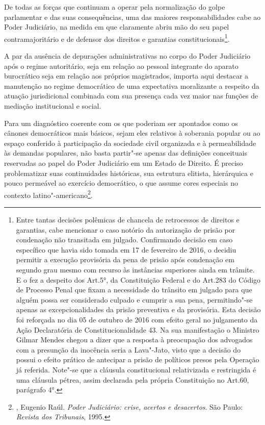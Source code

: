 De todas as forças que continuam a operar pela normalização do golpe
parlamentar e das suas consequências, uma das maiores responsabilidades
cabe ao Poder Judiciário, na medida em que claramente abriu mão do seu
papel contramajoritário e de defensor dos direitos e garantias
constitucionais\footnote{Entre tantas decisões polêmicas de chancela de
  retrocessos de direitos e garantias, cabe mencionar o caso notório da
  autorização de prisão por condenação não transitada em julgado.
  Confirmando decisão em caso específico que havia sido tomada em 17 de
  fevereiro de 2016, o  decidiu permitir a execução provisória da
  pena de prisão após condenação em segundo grau mesmo com recurso às
  instâncias superiores ainda em trâmite. E o fez a despeito dos Art.5°,
   da Constituição Federal e do Art.283 do Código de Processo Penal
  que fixam a necessidade do trânsito em julgado para que alguém possa
  ser considerado culpado e cumprir a sua pena, permitindo"-se apenas as
  excepcionalidades da prisão preventiva e da provisória. Esta decisão
  foi reforçada no dia 05 de outubro de 2016 com efeito geral no
  julgamento da Ação Declaratória de Constitucionalidade 43. Na sua
  manifestação o Ministro Gilmar Mendes chegou a dizer que a resposta à
  preocupação dos advogados com a presunção da inocência seria a
  Lava"-Jato, visto que a decisão do  possui o efeito prático de
  antecipar a prisão de políticos presos pela Operação já referida.
  Note"-se que a cláusula constitucional relativizada e restringida é uma
  cláusula pétrea, assim declarada pela própria Constituição no Art.60,
  parágrafo 4°.}.

A par da ausência de depurações administrativas no corpo do Poder
Judiciário após o regime autoritário, seja em relação ao pessoal
integrante do aparato burocrático seja em relação aos próprios
magistrados, importa aqui destacar a manutenção no regime democrático de
uma expectativa moralizante a respeito da atuação jurisdicional
combinada com sua presença cada vez maior nas funções de mediação
institucional e social.

Para um diagnóstico coerente com os que poderiam ser apontados como os
cânones democráticos mais básicos, sejam eles relativos à soberania
popular ou ao espaço conferido à participação da sociedade civil
organizada e à permeabilidade às demandas populares, não basta partir"-se
apenas das definições conceituais reservadas ao papel do Poder
Judiciário em um Estado de Direito. É preciso problematizar suas
continuidades históricas, sua estrutura elitista, hierárquica e pouco
permeável ao exercício democrático, o que assume cores especiais no
contexto latino"-americano\footnote{, Eugenio Raúl.
  \emph{Poder Judiciário: crise, acertos e desacertos}. São Paulo:
  \emph{Revista dos Tribunais}, 1995.}.

